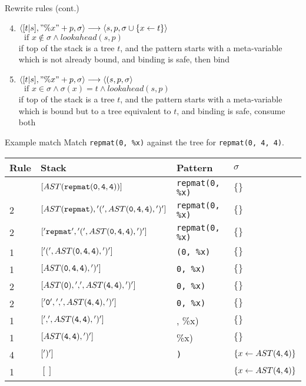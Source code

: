 \documentclass{beamer}
\begin{document}
\begin{frame}{Rewrite rules (cont.)}
\begin{enumerate}
\setcounter{enumi}{3}
\pause
\item $\langle [t|s], "\%x" + p, \sigma \rangle \longrightarrow \langle s, p, \sigma \cup \{x \leftarrow t \} \rangle$ \\ $ \,\,\,\, \text{if } x \not \in \sigma \wedge lookahead(s, p)$ \\
if top of the stack is a tree $t$, and the pattern starts with a meta-variable which is not already bound, and binding is safe, then bind
\pause
\item $\langle [t|s], "\%x" + p, \sigma \rangle \longrightarrow \langle (s, p, \sigma \rangle$ \\ $ \,\,\,\, \text{if } x \in \sigma \wedge \sigma(x) = t \wedge lookahead(s, p)$ \\
if top of the stack is a tree $t$, and the pattern starts with a meta-variable which is bound but to a tree equivalent to $t$, and binding is safe, consume both
\end{enumerate}
\end{frame}

\begin{frame}{Example match}
Match {\tt repmat(0, \%x)} against the tree for {\tt repmat(0, 4, 4)}. 
\begin{tiny}
\begin{tabular}{| l | l | l | l |}
\hline
Rule & Stack & Pattern & $\sigma$ \\ \hline
& $[AST({\tt repmat(0, 4, 4)})]$ & {\tt repmat(0, \%x)} & $\{\}$ \\ \hline
2 & $[AST({\tt repmat}), {\tt '('}, AST({\tt 0, 4, 4}), {\tt ')'}]$ & {\tt repmat(0, \%x)} & $\{\}$ \\ \hline
2 & $[{\tt 'repmat'}, {\tt '('}, AST({\tt 0, 4, 4}), {\tt ')'}]$ & {\tt repmat(0, \%x)} & $\{\}$ \\ \hline
1 & $[{\tt '('}, AST({\tt 0, 4, 4}), {\tt ')'}]$ & {\tt (0, \%x)} & $\{\}$ \\ \hline
1 & $[AST({\tt 0, 4, 4}), {\tt ')'}]$ & {\tt 0, \%x)} & $\{\}$ \\ \hline
2 & $[AST({\tt 0}), {\tt ','}, AST({\tt 4,4}), {\tt ')'}]$ & {\tt 0, \%x)} & $\{\}$ \\ \hline
2 & $[{\tt '0'}, {\tt ','}, AST({\tt 4,4}), {\tt ')'}]$ & {\tt 0, \%x)} & $\{\}$ \\ \hline
1 & $[{\tt ','}, AST({\tt 4,4}), {\tt ')'}]$ & {, \%x)} & $\{\}$ \\ \hline
1 & $[AST({\tt 4,4}), {\tt ')'}]$ & {\%x)} & $\{\}$ \\ \hline
4 & $[{\tt ')'}]$ & {\tt )} & $\{x \leftarrow AST({\tt 4,4})\}$ \\ \hline
1 & $[]$ & & $\{x \leftarrow AST({\tt 4,4})\}$ \\ \hline
\end{tabular}
\end{tiny}
\end{frame}
\end{document}
